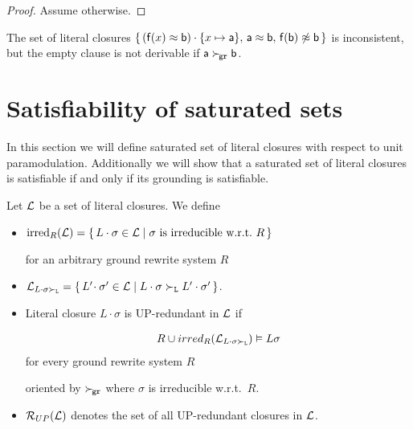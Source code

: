    \begin{proof}
        Assume otherwise.

   \end{proof}

           \begin{example}
        The set of literal closures
       \( \{ \,
        (\mathsf{f}(x)\approx\mathsf{b})\cdot \{ x\mapsto\mathsf{a} \}, \,
       \mathsf{a}\approx \mathsf{b}, \,
       \mathsf{f}(\mathsf{b})\not\approx\mathsf{b} \,
       \} \) is inconsistent,
        but the empty clause is not derivable
        if \( \mathsf{a}\mathrel\succ_{\!\mathtt{gr}}\mathsf{b} \).
           \end{example}

\section{Satisfiability of saturated sets}\label{sec:inst:saturated:sets}

In this section we will define saturated set of literal closures
with respect to unit paramodulation.
Additionally we will show that a saturated set of literal closures
is satisfiable if and only if its grounding is satisfiable.

   \begin{definition}[UP-Redundancy]
        Let \( \mathcal{L} \) be a set of literal closures. We define
       \begin{itemize}
           \item \( \operatorname{irred}_R(\mathcal{L}) =
           \{ \,
            L\cdot\sigma\in\mathcal{L} \mid
           \sigma\text{ is irreducible w.r.t.~}R
           \, \} \)

        for an arbitrary ground rewrite system \( R \)

       \item
       \(
       \mathcal{L}_{L\cdot\sigma\mathrel\succ_{\mathtt{L}}} =
       \{ \,
        L'\!\cdot\sigma'\in\mathcal{L} \mid
        L\cdot\sigma\mathrel\succ_{\mathtt{L}} L'\cdot\sigma'
       \, \}
         \).

       \item Literal closure \( L\cdot\sigma \) is UP-redundant in \( \mathcal{L} \) if

       \begin{gather*}
            R \cup irred_R(\mathcal{L}_{L\cdot\sigma\mathrel\succ_{\mathtt{L}}}) \vDash L\sigma
       \end{gather*}
        for every ground rewrite system \( R \)

        oriented by \( \mathrel\succ_{\!\mathtt{gr}} \)
        where \( \sigma \) is irreducible w.r.t.~\( R \).

       \item
       \( \mathcal{R}_{UP}(\mathcal{L}) \) denotes the set of all UP-redundant closures in \( \mathcal{L} \).
   \end{itemize}
\end{definition}

